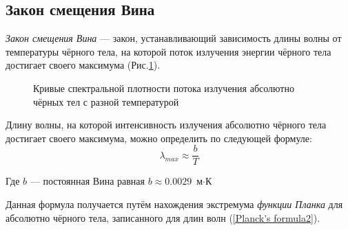 \subsection{Закон смещения Вина}
\textit{Закон смещения Вина} --- закон, устанавливающий зависимость длины волны от температуры чёрного тела, на которой поток излучения энергии чёрного тела достигает своего максимума (Рис.\ref{pic:wien-law}).

\begin{figure}[h!]
\begin{center}
\end{center}
\caption{Кривые спектральной плотности потока излучения абсолютно чёрных тел с разной температурой}\label{pic:wien-law}
\end{figure}

Длину волны, на которой интенсивность излучения абсолютно чёрного тела достигает своего максимума, можно определить по следующей формуле:
\begin{equation}
\lambda_{max}\approx\frac{b}{T}
\end{equation}

Где $b$ --- постоянная Вина равная $b\approx0.0029 $ $\text{м} \cdot \text{К}$

Данная формула получается путём нахождения экстремума \textit{функции Планка} для абсолютно чёрного тела, записанного для длин волн (\ref{Planck's formula2}).

